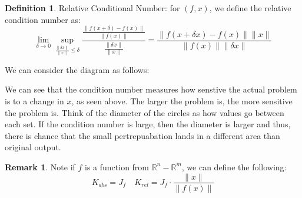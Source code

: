 \documentclass[11pt]{article}
\theoremstyle{definition}
\newtheorem{definition}{Definition}[section]
\newtheorem{remark}{Remark}[section]
\newcommand{\R}{\mathbb{R}}
\begin{document}
\begin{definition}
  Relative Conditional Number: for $(f,x)$, we define the relative condition number as:
  \[
  \lim_{\delta \to 0} \sup_{\frac{\| \delta x \|}{\|x\|} \leq \delta} \frac{\frac{\|f(x + \delta) - f(x)\|}{\|f(x)\|}}{\frac{\| \delta x \|}{\|x\|}} = \frac{\|f(x+ \delta x) - f(x)\| \|x\|}{\| f(x) \| \|\delta x \|}
  \]
\end{definition}
We can consider the diagram as follows:
\begin{center}
\end{center}
We can see that the condition number measures how senstive the actual problem is to a change in $x$, as seen above. The larger the problem is, the more sensitive the problem is. Think of the diameter of the circles as how values go between each set. If the condition number is large, then the diameter is larger and thus, there is chance that the small pertrepuabation lands in a different area than original output. 
\begin{remark}
  Note if $f$ is a function from $\R^n - \R^m$, we can define the following:
  \[
  K_{abs} = J_f \quad K_{rel} = J_f \cdot \frac{\|x\|}{\|f(x)\|}
  \]
\end{remark}
\end{document}
